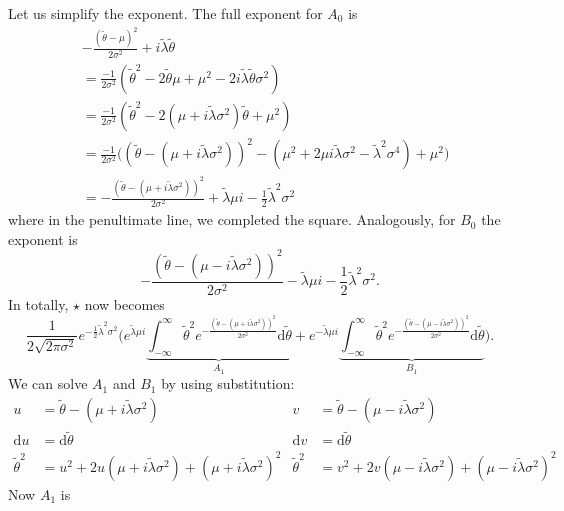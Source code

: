 \documentclass[]{report}
\begin{document}
Let us simplify the exponent. The full exponent for $A_0$ is
\begin{align}
    &-\frac{(\tilde{\theta}-\mu)^2}{2\sigma^2} + i\tilde{\lambda}\tilde{\theta}\\
    &=\frac{-1}{2\sigma^2}(\tilde{\theta}^2 - 2\tilde{\theta}\mu + \mu^2 - 2i\tilde{\lambda}\tilde{\theta}\sigma^2)\\
    &=\frac{-1}{2\sigma^2}(\tilde{\theta}^2 - 2(\mu + i\tilde{\lambda}\sigma^2)\tilde{\theta} + \mu^2)\\
    &=\frac{-1}{2\sigma^2}\big( (\tilde{\theta} - (\mu + i \tilde{\lambda} \sigma^2))^2 - (\mu^2 + 2\mu i \tilde{\lambda} \sigma^2 - \tilde{\lambda}^2 \sigma^4)+\mu^2\big)\\
    &=-\frac{(\tilde{\theta} - (\mu + i \tilde{\lambda} \sigma^2))^2}{2\sigma^2} + \tilde{\lambda} \mu i - \frac{1}{2}\tilde{\lambda}^2\sigma^2
\end{align}
where in the penultimate line, we completed the square. Analogously, for $B_0$ the exponent is
\begin{equation}
    -\frac{(\tilde{\theta} - (\mu - i \tilde{\lambda} \sigma^2))^2}{2\sigma^2} - \tilde{\lambda} \mu i - \frac{1}{2}\tilde{\lambda}^2\sigma^2.
\end{equation}
In totally, $\star$ now becomes
\begin{equation}
    \frac{1}{2\sqrt{2\pi \sigma^2}} e^{-\frac{1}{2}\tilde{\lambda}^2\sigma^2}
    \Big(
        e^{\tilde{\lambda} \mu i}\underbrace{\int_{-\infty}^{\infty}\tilde{\theta}^2e^{-\frac{(\tilde{\theta} - (\mu + i \tilde{\lambda} \sigma^2))^2}{2\sigma^2}} \text{d}\tilde{\theta}}_{A_1} +
        e^{-\tilde{\lambda} \mu i}\underbrace{\int_{-\infty}^{\infty}\tilde{\theta}^2e^{-\frac{(\tilde{\theta} - (\mu - i \tilde{\lambda} \sigma^2))^2}{2\sigma^2}}\text{d}\tilde{\theta}}_{B_1}
    \Big).
\end{equation}
We can solve $A_1$ and $B_1$ by using substitution:
\begin{align}
    u &= \tilde{\theta} - (\mu + i \tilde{\lambda} \sigma^2) & v &= \tilde{\theta} - (\mu - i \tilde{\lambda} \sigma^2)\\
    \text{d}u &= \text{d}\tilde{\theta} & \text{d}v &= \text{d}\tilde{\theta}\\
    \tilde{\theta}^2 &= u^2 + 2u(\mu + i \tilde{\lambda} \sigma^2) + (\mu + i \tilde{\lambda} \sigma^2)^2 &
    \tilde{\theta}^2 &= v^2 + 2v(\mu - i \tilde{\lambda} \sigma^2) + (\mu - i \tilde{\lambda} \sigma^2)^2
\end{align}
Now $A_1$ is
\end{document}
